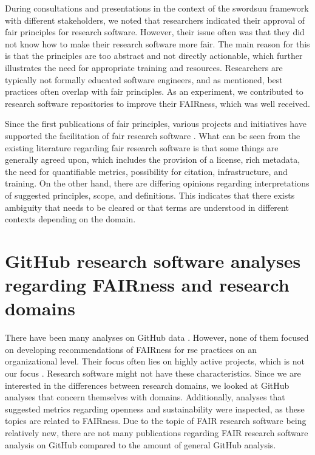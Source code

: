 During consultations and presentations in the context of the \acrshort{swordsuu} framework with different stakeholders, we noted that researchers indicated their approval of \acrshort{fair} principles for research software. However, their issue often was that they did not know how to make their research software more \acrshort{fair}. The main reason for this is that the principles are too abstract and not directly actionable, which further illustrates the need for appropriate training and resources. Researchers are typically not formally educated software engineers, and as mentioned, best practices often overlap with \acrshort{fair} principles. As an experiment, we contributed to research software repositories to improve their FAIRness, which was well received.


Since the first publications of \acrshort{fair} principles, various projects and initiatives have supported the facilitation of \acrshort{fair} research software \cite{van_lissa_worcs_2021, de_Bruin_Scan_and_revieW_2021, Spaaks_howfairis, ringersma_i-pass_2021, noauthor_codemeta_2021, martinez_survey_2022, ardcfairsoftware}.
What can be seen from the existing literature regarding \acrshort{fair} research software is that some things are generally agreed upon, which includes the provision of a license, rich metadata, the need for quantifiable metrics, possibility for citation, infrastructure, and training. On the other hand, there are differing opinions regarding interpretations of suggested principles, scope, and definitions. This indicates that there exists ambiguity that needs to be cleared or that terms are understood in different contexts depending on the domain.









\section{GitHub research software analyses regarding FAIRness and research domains}
\label{sec:lit_github}
There have been many analyses on GitHub data \cite{cosentino_systematic_2017}. However, none of them focused on developing recommendations of FAIRness for \acrshort{rse} practices on an organizational level. Their focus often lies on highly active projects, which is not our focus \cite{hu_influence_2016, borges_understanding_2016, blincoe_understanding_2016, sheoran_understanding_2014, ma_what_2016, kochhar_empirical_2013, ray_large_2014}. Research software might not have these characteristics. Since we are interested in the differences between research domains, we looked at GitHub analyses that concern themselves with domains. Additionally, analyses that suggested metrics regarding openness and sustainability were inspected, as these topics are related to FAIRness. 
Due to the topic of FAIR research software being relatively new, there are not many publications regarding FAIR research software analysis on GitHub compared to the amount of general GitHub analysis.

